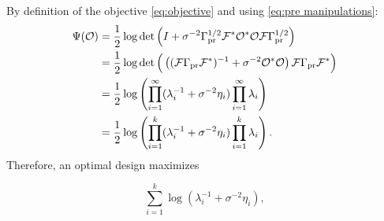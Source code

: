 \documentclass{amsart}
\numberwithin{equation}{section}
\begin{document}
By definition of the objective \eqref{eq:objective} and using
\eqref{eq:pre manipulations}:
\begin{align}\label{eq:mod objective}
  \begin{split}
    \Psi ( \mathcal{O} ) &=\frac12 \log \det \left( I + \sigma^{-2}
    \Gamma_{\textup{pr}}^{1/2} \mathcal{F} ^* \mathcal{O}^* \mathcal{O} \mathcal{F} \Gamma_{\textup{pr}}^{1/2} \right )\\
    &=\frac12 \log \det \Big ( \left ( (\mathcal{F} \Gamma_{\textup{pr}} \mathcal{F}^* )^{-1} +
    \sigma^{-2}\mathcal{O}^* \mathcal{O} \right ) \mathcal{F} \Gamma_{\textup{pr}} \mathcal{F}^* \Big )\\
    &=\frac12 \log \left (\prod_{i=1}^{\infty} ( \lambda_i^{-1} + \sigma^{-2} \eta_i ) \prod_{i=1}^{\infty} \lambda_i \right ) \\
    &=\frac12 \log \left ( \prod_{i=1}^{k} ( \lambda_i^{-1} + \sigma^{-2} \eta_i )\prod_{i=1}^{k} \lambda_i \right ). 
  \end{split}
\end{align}
Therefore, an optimal design maximizes

\begin{equation}\label{eq:true target}
  \sum_{i=1}^{k}\log (\lambda_i^{-1} + \sigma^{-2} \eta_i),
\end{equation}

\testdata
\end{document}
